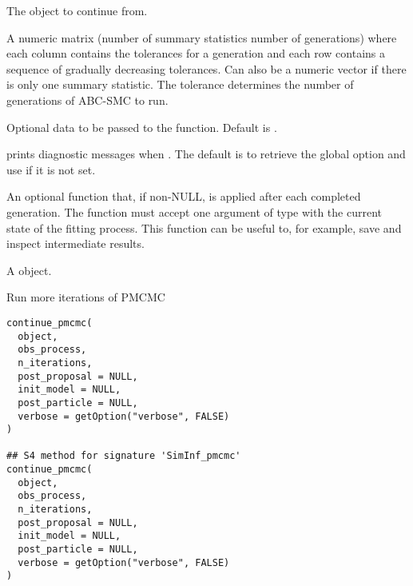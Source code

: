 \documentclass[letterpaper]{book}
\begin{document}
\begin{Arguments}
\begin{ldescription}
\item[\code{object}] The  object to continue from.

\item[\code{tolerance}] A numeric matrix (number of summary statistics
\eqn{\times}{} number of generations) where each column contains
the tolerances for a generation and each row contains a
sequence of gradually decreasing tolerances. Can also be a
numeric vector if there is only one summary statistic. The
tolerance determines the number of generations of ABC-SMC to
run.

\item[\code{data}] Optional data to be passed to the
 function. Default is .

\item[\code{verbose}] prints diagnostic messages when . The
default is to retrieve the global option  and
use  if it is not set.

\item[\code{post\_gen}] An optional function that, if non-NULL, is applied
after each completed generation. The function must accept one
argument of type  with the current state of
the fitting process. This function can be useful to, for
example, save and inspect intermediate results.
\end{ldescription}
\end{Arguments}
%
\begin{Value}
A  object.
\end{Value}
%
\begin{Description}
Run more iterations of PMCMC
\end{Description}
%
\begin{Usage}
\begin{verbatim}
continue_pmcmc(
  object,
  obs_process,
  n_iterations,
  post_proposal = NULL,
  init_model = NULL,
  post_particle = NULL,
  verbose = getOption("verbose", FALSE)
)

## S4 method for signature 'SimInf_pmcmc'
continue_pmcmc(
  object,
  obs_process,
  n_iterations,
  post_proposal = NULL,
  init_model = NULL,
  post_particle = NULL,
  verbose = getOption("verbose", FALSE)
)
\end{verbatim}
\end{Usage}
\end{document}
